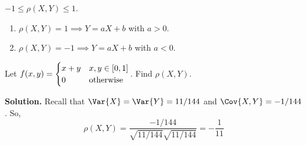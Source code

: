 \begin{Theorem}{}{}
    $ -1\leqslant \rho(X,Y)\leqslant 1 $.
    \begin{enumerate}[label=(\arabic*)]
        \item $ \rho(X,Y)=1\implies Y=aX+b $ with $ a>0 $.
        \item $ \rho(X,Y)=-1\implies Y=aX+b $ with $ a<0 $.
    \end{enumerate}
\end{Theorem}
\begin{Example}{}{}
    Let $ \displaystyle f(x,y)=\begin{cases}
            x+y & x,y\in\interval{0}{1} \\
            0   & \text{otherwise}
        \end{cases} $.
    Find $ \rho(X,Y) $.

    \textbf{Solution.} Recall that $ \Var{X}=\Var{Y}=11/144 $
    and $ \Cov{X,Y}=-1/144 $. So,
    \[ \rho(X,Y)=\frac{-1/144}{\sqrt{11/144}\sqrt{11/144}} =-\frac{1}{11}  \]

\end{Example}
